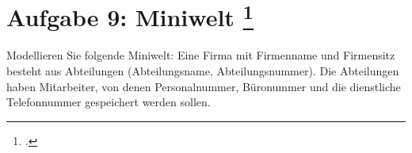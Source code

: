 \documentclass{bschlangaul-aufgabe}
\begin{document}

\section{Aufgabe 9: Miniwelt
\footcite{db:ab:klausurvorbereitung}}

Modellieren Sie folgende Miniwelt: Eine Firma mit Firmenname und
Firmensitz besteht aus Abteilungen (Abteilungsname, Abteilungsnummer).
Die Abteilungen haben Mitarbeiter, von denen Personalnummer, Büronummer
und die dienstliche Telefonnummer gespeichert werden sollen.
\end{document}
